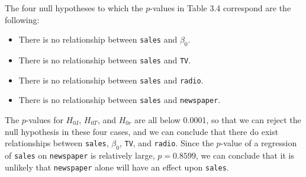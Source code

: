 The four null hypotheses to which the $p$-values in Table 3.4
correspond are the following:
\begin{itemize}
    \item[$H_{0I}$:]
        There is no relationship between \verb|sales| and $\beta_0$.
    \item[$H_{0T}$:]
        There is no relationship between \verb|sales| and \verb|TV|.
    \item[$H_{0r}$:]
        There is no relationship between \verb|sales| and \verb|radio|.
    \item[$H_{0n}$:]
        There is no relationship between \verb|sales| and \verb|newspaper|.
\end{itemize}
The $p$-values for $H_{0I}$, $H_{0T}$, and $H_{0r}$ are all below
0.0001, so that we can
reject the null hypothesis in these four cases, and we can conclude
that there do exist
relationships between \verb|sales|, $\beta_0$, \verb|TV|, and
\verb|radio|. Since the
$p$-value of a regression of \verb|sales| on \verb|newspaper| is
relatively large,
$p = 0.8599$, we can conclude that it is unlikely that
\verb|newspaper| alone will have
an effect upon \verb|sales|.
